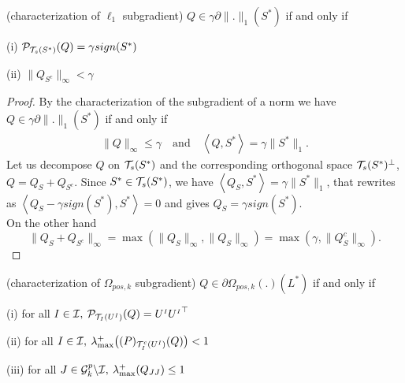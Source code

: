\documentclass[letterpaper]{article}
\begin{document}
\begin{lemma}(characterization of $\ell_1$ subgradient) $Q\in \gamma \partial \|.\|_1(S^*)$ if and only if
\item[(i)] $\mathcal{P}_{\mathcal{T}_s(S^*)}(Q)=\gamma sign(S^*)$
\item[(ii)] $\|Q_{S^c}\|_{\infty}<\gamma$
\end{lemma}
\begin{proof}
By the characterization of the subgradient of a norm we have $Q\in \gamma \partial \|.\|_1(S^*)$ if and only if
\begin{align}
\|Q\|_{\infty}\leq \gamma \quad \text{and} \quad \left\langle Q,S^*\right\rangle=\gamma\|S^*\|_1. \label{eq:subgl1}
\end{align}
Let us decompose $Q$ on $\mathcal{T}_s(S^*)$ and the corresponding orthogonal space $\mathcal{T}_s(S^*)^{\perp}$, $Q= Q_S+Q_{S^c}$. Since $S^*\in\mathcal{T}_s(S^*)$, we have $\left\langle Q_S,S^*\right\rangle=\gamma\|S^*\|_1$, that rewrites as  $\left\langle Q_S-\gamma sign(S^*),S^*\right\rangle=0$ and gives $Q_S=\gamma sign(S^*)$.\\
On the other hand 
$$\|Q_S+Q_{S^c}\|_{\infty}=\max\left(\|Q_S\|_{\infty},\|Q_S\|_{\infty}\right)=\max\left(\gamma,\|Q_S^c\|_{\infty}\right).$$
\end{proof}
\begin{lemma}(characterization of $\Omega_{pos,k}$ subgradient) $Q\in \partial \Omega_{pos,k}(.)(L^*)$ if and only if
\item[(i)] for all $I \in \mathcal{I},\:\mathcal{P}_{\mathcal{T}_I(U^{{\scriptscriptstyle I}})}(Q)=U^{{\scriptscriptstyle I}}{U^{{\scriptscriptstyle I}}}^\top$
\item[(ii)] for all $I \in \mathcal{I},\:\lambda_{\max}^+\big (\mathcal(P)_{\mathcal{T}_I^c(U^{{\scriptscriptstyle I}})}(Q) \big )<1$
\item[(iii)] for all $J \in \mathcal{G}^p_k \backslash \mathcal{I}, \: \lambda_{\max}^+(Q_{JJ})\leq 1$
\end{lemma}
\end{document}
